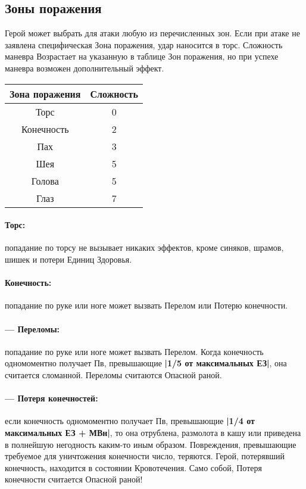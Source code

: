 \subsection{Зоны поражения}
Герой может выбрать для атаки любую из перечисленных зон. Если при атаке не заявлена специфическая Зона поражения, удар наносится в торс.
\newline Сложность маневра Возрастает на указанную в таблице Зон поражения, но при успехе маневра возможен дополнительный эффект.
\begin{center}
\begin{tabular}{|c|c|}
\hline
Зона поражения & Сложность \\ \hline
Торс & 0 \\ \hline
Конечность & 2 \\ \hline
Пах & 3 \\ \hline
Шея & 5 \\ \hline
Голова & 5 \\ \hline
Глаз & 7 \\ \hline
\end{tabular}
\end{center}
\paragraph{Торс:} попадание по торсу не вызывает никаких эффектов, кроме синяков, шрамов, шишек и потери Единиц Здоровья.
\paragraph{Конечность:} попадание по руке или ноге может вызвать Перелом или Потерю конечности.
\paragraph{— Переломы:} попадание по руке или ноге может вызвать Перелом. Когда конечность одномоментно получает Пв, превышающие \textbf{|1/5 от максимальных ЕЗ|}, она считается сломанной. Переломы считаются Опасной раной.
\paragraph{— Потеря конечностей:} если конечность одномоментно получает Пв, превышающие \textbf{|1/4 от максимальных ЕЗ + МВн|}, то она отрублена, размолота в кашу или приведена в полнейшую негодность каким-то иным образом. Повреждения, превышающие требуемое для уничтожения конечности число, теряются. Герой, потерявший конечность, находится в состоянии Кровотечения. Само собой, Потеря конечности считается Опасной раной!
